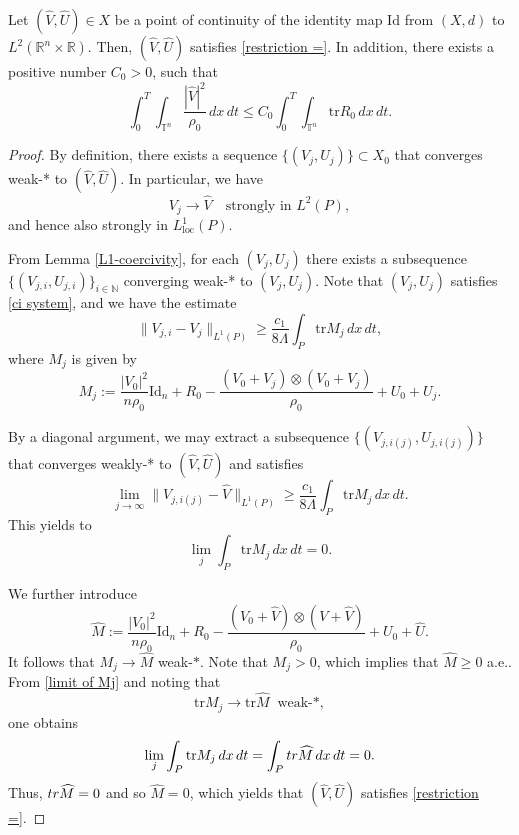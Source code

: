 \documentclass[10pt,a4paper]{amsart}
\newcommand{\R}{{\mathbb R}}
\newcommand{\id}{\mathrm{Id}}
\newcommand{\trace}{\mathrm{tr}}
\newcommand{\tr}{{\rm tr}}
\begin{document}
\begin{Proposition}
\label{proposition points}
Let $(\widehat{V},\widehat{U})\in X$ be a point of continuity of the identity map $\id$ from $(X,d)$ to $L^2(\R^n\times\R)$. Then, $(\widehat{V},\widehat{U})$ satisfies \eqref{restriction =}. In addition, there exists a positive number $C_0>0$, such that 
 $$
 \int_0^T\int_{\mathbb{T}^n}\frac{|\widehat{V}|^2}{\rho_0}\,dx\,dt\leq C_0\int_0^T\int_{\mathbb{T}^n} \trace R_0\,dx\,dt.
 $$
\end{Proposition}

\begin{proof}
By definition, there exists a sequence $\{(V_j, U_j)\} \subset X_0$ that converges weak-* to $(\widehat{V}, \widehat{U})$. In particular, we have
\[
V_j \to \widehat{V} \quad \text{strongly in } L^2(P),
\]
and hence also strongly in $L^1_{\text{loc}}(P)$.

From Lemma \ref{L1-coercivity}, for each $(V_j, U_j)$ there exists a subsequence $\{(V_{j,i}, U_{j,i})\}_{i\in \mathbb{N}}$ converging weak-* to $(V_j, U_j)$. Note that $(V_j, U_j)$ satisfies \eqref{ci system}, and we have the estimate
\[
\|V_{j,i} - V_j\|_{L^1(P)} \geq \frac{c_1}{8\Lambda} \int_P \trace M_j \, dx\,dt,
\]
where $M_j$ is given by
\[
M_j := \frac{|V_0|^2}{n\rho_0} \id_n + R_0 - \frac{(V_0 + V_j) \otimes (V_0 + V_j)}{\rho_0} + U_0 + U_j.
\]

By a diagonal argument, we may extract a subsequence $\{(V_{j,i(j)}, U_{j,i(j)})\}$ that converges weakly-* to $(\widehat{V}, \widehat{U})$ and satisfies
\[
\lim_{j \to \infty} \|V_{j,i(j)} - \widehat{V}\|_{L^1(P)} \geq \frac{c_1}{8\Lambda} \int_P \trace M_j \, dx\,dt.
\]
  This yields to 
\begin{equation}
  \label{limit of Mj}
  \lim_{j}\int_{P}\trace M_j\,dx\,dt=0.
\end{equation}
  
We further introduce  
\begin{equation*}
  \widehat{M} := \frac{|V_0|^2}{n\rho_0} \id_n +R_0-\frac{(V_0+\widehat{V})\otimes (V+\widehat{V})}{\rho_0}+U_0+\widehat{U}.
  \end{equation*}
It follows that $M_j\to \widehat{M}$ weak-$*$. Note that $M_j>0$, which implies that $\widehat{M}\geq 0$ a.e.. From \eqref{limit of Mj} and noting that 
$$
\trace M_j\to \trace \widehat{M}\;\;\text{weak-}*,
$$
one obtains  
\begin{equation*}
  \lim_{j}\int_{P} \trace M_j\,dx\,dt = \int_P\tr \widehat{M}\,dx\,dt=0.
\end{equation*}
   Thus, $\tr \widehat{M}=0$ and so $\widehat{M}=0$, which yields that $(\widehat{V},\widehat{U})$ satisfies  \eqref{restriction =}.
    

\end{proof}
\end{document}
